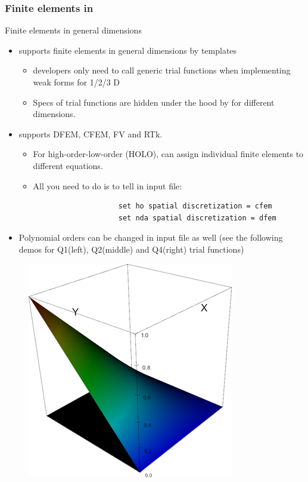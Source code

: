 \begin{frame}[fragile]
	\frametitle{Finite elements in }
	\begin{block}{Finite elements in general dimensions}
		\begin{itemize}
			\item {} supports finite elements in general dimensions by templates
			\begin{itemize}
				\item {} developers only need to call generic trial functions when implementing weak forms for 1/2/3 D
				\item Specs of trial functions are hidden under the hood by  for different dimensions.
			\end{itemize}
			\item {} supports DFEM, CFEM, FV and RTk.
			\begin{itemize}
				\item For high-order-low-order (HOLO),  can assign individual finite elements to different equations.
				\item All you need to do is to tell  in input file:
				{
					\color{red}
					\begin{verbatim}
					set ho spatial discretization = cfem
					set nda spatial discretization = dfem
					\end{verbatim}
				}
			\end{itemize}
			\item Polynomial orders can be changed in input file as well (see the following demos for Q1(left), Q2(middle) and Q4(right) trial functions)
		\end{itemize}
	\end{block}
	\begin{figure}
		\includegraphics*[scale=0.25]{graphic/fe/q1_fe}

\end{figure}
\end{frame}
